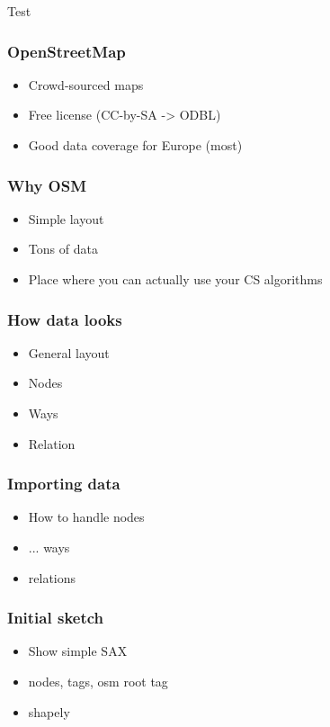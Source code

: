 \documentclass{beamer}
\begin{document}
\begin{frame}{Test}
  \begin{center}
    
  \end{center}
\end{frame}

\begin{frame}
  \frametitle{OpenStreetMap}
  \begin{itemize}
  \item Crowd-sourced maps
  \item Free license (CC-by-SA -> ODBL)
  \item Good data coverage for Europe (most)
  \end{itemize}
\end{frame}

\begin{frame}
  \frametitle{Why OSM}
  \begin{itemize}
  \item Simple layout
  \item Tons of data
  \item Place where you can actually use your CS algorithms
  \end{itemize}
\end{frame}


\begin{frame}
  \frametitle{How data looks}
  \begin{itemize}
  \item General layout
  \item Nodes
  \item Ways
  \item Relation
  \end{itemize}
\end{frame}

\begin{frame}
  \frametitle{Importing data}
  \begin{itemize}
  \item How to handle nodes
  \item ... ways
  \item relations
  \end{itemize}
\end{frame}

\begin{frame}
  \frametitle{Initial sketch}
  \begin{itemize}
  \item Show simple SAX
  \item nodes, tags, osm root tag
  \item shapely
  \end{itemize}
\end{frame}
\end{document}
